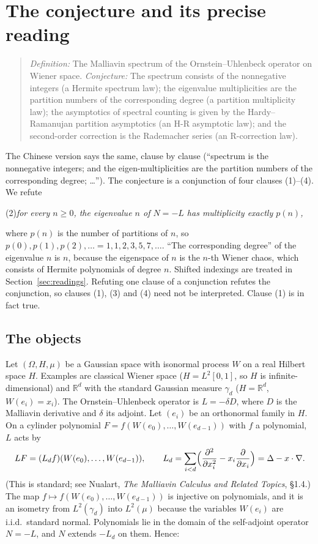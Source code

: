 \documentclass[11pt]{article}
\theoremstyle{definition}
\theoremstyle{remark}
\newcommand{\R}{\mathbb{R}}
\begin{document}
\section{The conjecture and its precise reading}
\begin{quote}
\emph{Definition:} The Malliavin spectrum of the Ornstein--Uhlenbeck operator on
Wiener space. \emph{Conjecture:} The spectrum consists of the nonnegative integers
(a Hermite spectrum law); the eigenvalue multiplicities are the partition numbers
of the corresponding degree (a partition multiplicity law); the asymptotics of
spectral counting is given by the Hardy--Ramanujan partition asymptotics (an H-R
asymptotic law); and the second-order correction is the Rademacher series (an
R-correction law).
\end{quote}
The Chinese version says the same, clause by clause (``spectrum is the nonnegative
integers; and the eigen-multiplicities are the partition numbers of the
corresponding degree; \dots''). The conjecture is a conjunction of four clauses
(1)--(4). We refute
\begin{center}
(2)\quad \emph{for every $n\ge0$, the eigenvalue $n$ of $N=-L$ has multiplicity
exactly $p(n)$,}
\end{center}
where $p(n)$ is the number of partitions of $n$, so $p(0),p(1),p(2),\ldots=1,1,2,3,5,7,\ldots$.
``The corresponding degree'' of the eigenvalue $n$ is $n$, because the eigenspace of
$n$ is the $n$-th Wiener chaos, which consists of Hermite polynomials of degree $n$.
Shifted indexings are treated in Section~\ref{sec:readings}.
Refuting one clause of a conjunction refutes the conjunction, so clauses (1), (3)
and (4) need not be interpreted. Clause (1) is in fact true.

\subsection*{The objects}
Let $(\Omega,H,\mu)$ be a Gaussian space with isonormal process $W$ on a real
Hilbert space $H$. Examples are classical Wiener space ($H=L^2[0,1]$, so $H$ is
infinite-dimensional) and $\R^d$ with the standard Gaussian measure $\gamma_d$
($H=\R^d$, $W(e_i)=x_i$). The Ornstein--Uhlenbeck operator is $L=-\delta D$, where
$D$ is the Malliavin derivative and $\delta$ its adjoint. Let $(e_i)$ be an
orthonormal family in $H$. On a cylinder polynomial $F=f(W(e_0),\dots,W(e_{d-1}))$ with
$f$ a polynomial, $L$ acts by
\begin{equation}\label{eq:L}
LF=(L_df)(W(e_0),\dots,W(e_{d-1})),\qquad
L_d=\sum_{i<d}\Bigl(\frac{\partial^2}{\partial x_i^2}-x_i\frac{\partial}{\partial x_i}\Bigr)
=\Delta-x\cdot\nabla .
\end{equation}
(This is standard; see Nualart, \emph{The Malliavin Calculus and Related Topics},
\S1.4.) The map $f\mapsto f(W(e_0),\dots,W(e_{d-1}))$ is injective on polynomials, and
it is an isometry from $L^2(\gamma_d)$ into $L^2(\mu)$ because the variables $W(e_i)$
are i.i.d.\ standard normal. Polynomials lie in the domain of the self-adjoint
operator $N=-L$, and $N$ extends $-L_d$ on them. Hence:
\end{document}
